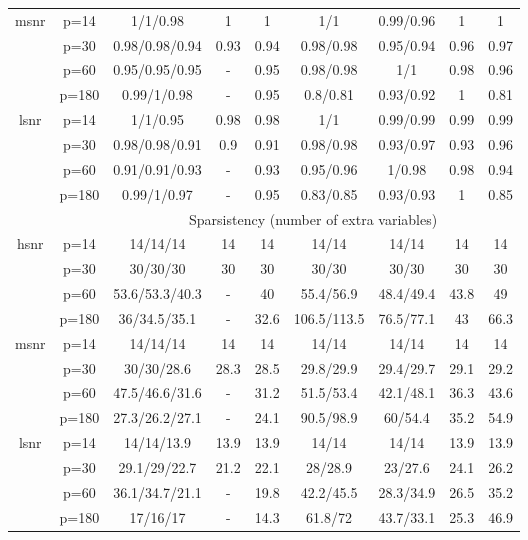 \begin{table}[ht]
{\begin{tabular}{|c|c|ccccccc|}
  \midrule\multirow{4}[2]{*}{msnr} & p=14 & 1/1/0.98 & 1 & 1 & 1/1 & 0.99/0.96 & 1 & 1 \\ 
   & p=30 & 0.98/0.98/0.94 & 0.93 & 0.94 & 0.98/0.98 & 0.95/0.94 & 0.96 & 0.97 \\ 
   & p=60 & 0.95/0.95/0.95 & - & 0.95 & 0.98/0.98 & 1/1 & 0.98 & 0.96 \\ 
   & p=180 & 0.99/1/0.98 & - & 0.95 & 0.8/0.81 & 0.93/0.92 & 1 & 0.81 \\ 
  \midrule\multirow{4}[2]{*}{lsnr} & p=14 & 1/1/0.95 & 0.98 & 0.98 & 1/1 & 0.99/0.99 & 0.99 & 0.99 \\ 
   & p=30 & 0.98/0.98/0.91 & 0.9 & 0.91 & 0.98/0.98 & 0.93/0.97 & 0.93 & 0.96 \\ 
   & p=60 & 0.91/0.91/0.93 & - & 0.93 & 0.95/0.96 & 1/0.98 & 0.98 & 0.94 \\ 
   & p=180 & 0.99/1/0.97 & - & 0.95 & 0.83/0.85 & 0.93/0.93 & 1 & 0.85 \\ 
   \midrule 
 \multicolumn{1}{|c}{} &       & \multicolumn{7}{c|}{Sparsistency (number of extra variables)} \\
\midrule\multirow{4}[2]{*}{hsnr} & p=14 & 14/14/14 & 14 & 14 & 14/14 & 14/14 & 14 & 14 \\ 
   & p=30 & 30/30/30 & 30 & 30 & 30/30 & 30/30 & 30 & 30 \\ 
   & p=60 & 53.6/53.3/40.3 & - & 40 & 55.4/56.9 & 48.4/49.4 & 43.8 & 49 \\ 
   & p=180 & 36/34.5/35.1 & - & 32.6 & 106.5/113.5 & 76.5/77.1 & 43 & 66.3 \\ 
  \midrule\multirow{4}[2]{*}{msnr} & p=14 & 14/14/14 & 14 & 14 & 14/14 & 14/14 & 14 & 14 \\ 
   & p=30 & 30/30/28.6 & 28.3 & 28.5 & 29.8/29.9 & 29.4/29.7 & 29.1 & 29.2 \\ 
   & p=60 & 47.5/46.6/31.6 & - & 31.2 & 51.5/53.4 & 42.1/48.1 & 36.3 & 43.6 \\ 
   & p=180 & 27.3/26.2/27.1 & - & 24.1 & 90.5/98.9 & 60/54.4 & 35.2 & 54.9 \\ 
  \midrule\multirow{4}[2]{*}{lsnr} & p=14 & 14/14/13.9 & 13.9 & 13.9 & 14/14 & 14/14 & 13.9 & 13.9 \\ 
   & p=30 & 29.1/29/22.7 & 21.2 & 22.1 & 28/28.9 & 23/27.6 & 24.1 & 26.2 \\ 
   & p=60 & 36.1/34.7/21.1 & - & 19.8 & 42.2/45.5 & 28.3/34.9 & 26.5 & 35.2 \\ 
   & p=180 & 17/16/17 & - & 14.3 & 61.8/72 & 43.7/33.1 & 25.3 & 46.9 \\ 
   \bottomrule 
\end{tabular}
}
\end{table}
